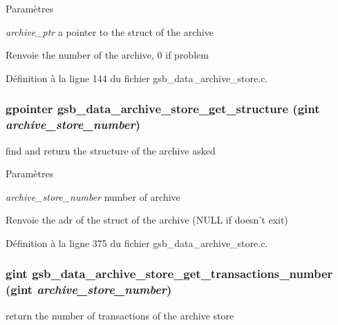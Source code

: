\begin{DoxyParams}{Paramètres}
\item[{\em archive\_\-ptr}]a pointer to the struct of the archive\end{DoxyParams}
\begin{DoxyReturn}{Renvoie}
the number of the archive, 0 if problem 
\end{DoxyReturn}


Définition à la ligne 144 du fichier gsb\_\-data\_\-archive\_\-store.c.

\subsubsection[{gsb\_\-data\_\-archive\_\-store\_\-get\_\-structure}]{\setlength{\rightskip}{0pt plus 5cm}gpointer gsb\_\-data\_\-archive\_\-store\_\-get\_\-structure (gint {\em archive\_\-store\_\-number})}\label{gsb__data__archive__store_8c_a8f4e543de3ce18287a65f5451d7ba874}
find and return the structure of the archive asked


\begin{DoxyParams}{Paramètres}
\item[{\em archive\_\-store\_\-number}]number of archive\end{DoxyParams}
\begin{DoxyReturn}{Renvoie}
the adr of the struct of the archive (NULL if doesn't exit) 
\end{DoxyReturn}


Définition à la ligne 375 du fichier gsb\_\-data\_\-archive\_\-store.c.

\subsubsection[{gsb\_\-data\_\-archive\_\-store\_\-get\_\-transactions\_\-number}]{\setlength{\rightskip}{0pt plus 5cm}gint gsb\_\-data\_\-archive\_\-store\_\-get\_\-transactions\_\-number (gint {\em archive\_\-store\_\-number})}\label{gsb__data__archive__store_8c_a7e6138f285a9614074ba5b29e02cccdd}
return the number of transactions of the archive store


